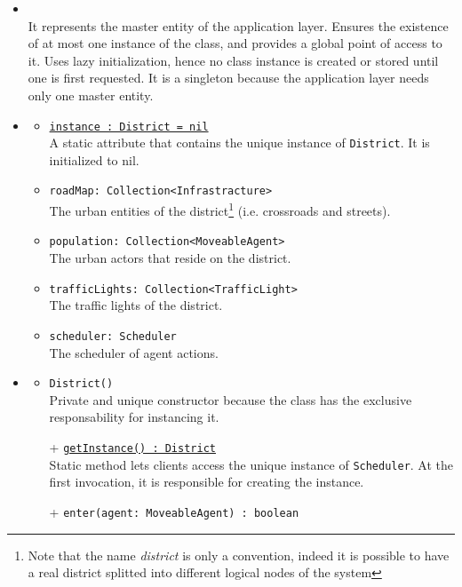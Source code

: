 \begin{itemize}
  \item \textbf{\descr} \\
  It represents the master entity of the application layer. 
  Ensures the existence of at most one instance of the class, 
  and provides a global point of access to it.
  Uses lazy initialization, hence no class instance is created 
  or stored until one is first requested.
  It is a singleton because the application layer needs 
  only one master entity.
  \item \textbf{\attrs}
  \begin{itemize}
    \item \texttt{\underline{instance : District = nil}} \\
    A static attribute that contains the unique instance of \texttt{District}.
    It is initialized to nil.
    \item \texttt{roadMap: Collection<Infrastracture>} \\
    The urban entities of the district\footnote{Note that the name 
    \textit{district} is only a convention, indeed it is possible to have a 
    real district splitted into different logical nodes of the system}
    (i.e. crossroads and streets). 
    \item \texttt{population: Collection<MoveableAgent>} \\
    The urban actors that reside on the district.
    \item \texttt{trafficLights: Collection<TrafficLight>} \\
    The traffic lights of the district.
    \item \texttt{scheduler: Scheduler} \\
    The scheduler of agent actions.
  \end{itemize}
  \item \textbf{\ops}
  \begin{itemize}
    \item \texttt{District()} \\
    Private and unique constructor because the class has the exclusive 
    responsability for instancing it.
    \item[+] \texttt{\underline{getInstance() : District}} \\
    Static method lets clients access the unique instance 
    of \texttt{Scheduler}. At the first invocation, it is responsible 
    for creating the instance.
    \item[+] \texttt{enter(agent: MoveableAgent) : boolean} \\

\end{itemize}
\end{itemize}
